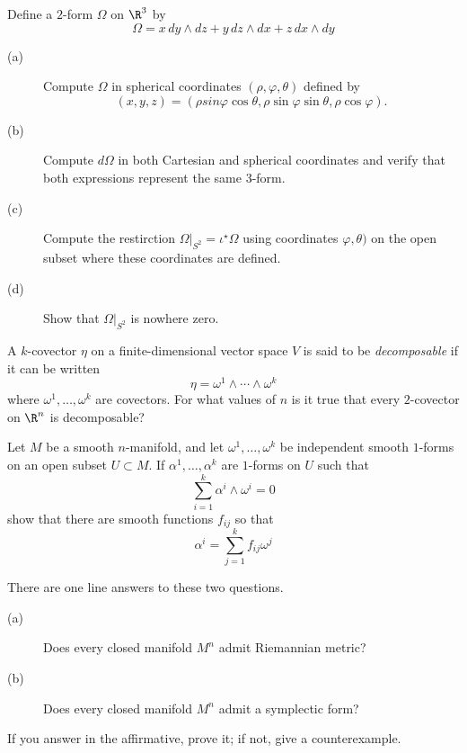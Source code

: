 \documentclass[12pt]{pset}
\begin{document}
\begin{problem}[Lee 12--6]

  Define a $2$-form $\Omega$ on $\R^3$ by
$$
\Omega = x\, dy \wedge dz + y\, dz \wedge dx + z\, dx \wedge dy
$$
\begin{description}
\item[(a)] Compute $\Omega$ in spherical coordinates
  $(\rho,\varphi,\theta)$ defined by
$$(x,y,z) = (\rho sin \varphi \cos \theta, \rho \sin \varphi \sin \theta, \rho \cos \varphi).$$
\item[(b)] Compute $d\Omega$ in both Cartesian and spherical
  coordinates and verify that both expressions represent the same 3-form. 
\item[(c)] Compute the restirction $\Omega|_{S^2} = \iota^\star
  \Omega$ using coordinates $\varphi,\theta)$ on the open subset where
  these coordinates are defined.
\item[(d)] Show that $\Omega|_{S^2}$ is nowhere zero.
\end{description}

\end{problem}

\begin{problem}[Lee 12--5]

A $k$-covector $\eta$ on a finite-dimensional vector space $V$ is said
to be \textit{decomposable} if it can be written
$$
\eta = \omega^1 \wedge \cdots \wedge \omega^k
$$
where $\omega^1, \ldots, \omega^k$ are covectors.  For what values of
$n$ is it true that every $2$-covector on $\R^n$ is decomposable?

\end{problem}

\begin{problem}

  Let $M$ be a smooth $n$-manifold, and let $\omega^1, \ldots,
  \omega^k$ be independent smooth $1$-forms on an open subset $U
  \subset M$.  If $\alpha^1, \ldots, \alpha^k$ are $1$-forms on $U$
  such that
$$
\sum_{i=1}^k \alpha^i \wedge \omega^i = 0
$$
show that there are smooth functions $f_{ij}$ so that
$$
\alpha^i = \sum_{j=1}^k f_{ij} \omega^j
$$

\end{problem}

\begin{problem}

  There are one line answers to these two questions.
  \begin{description}
  \item[(a)] Does every closed manifold $M^n$ admit Riemannian metric?
  \item[(b)] Does every closed manifold $M^n$ admit a symplectic form?
  \end{description}
  If you answer in the affirmative, prove it; if not, give a
  counterexample.

\end{problem}
\end{document}
